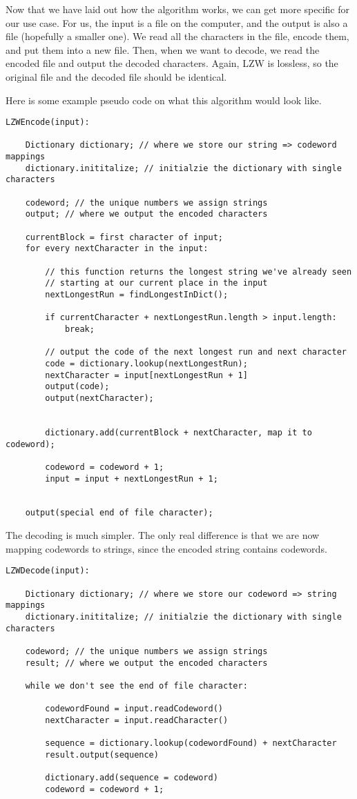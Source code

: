 \documentclass[12pt,twoside]{reedthesis}
\begin{document}
Now that we have laid out how the algorithm works, we can get more specific for our use case. For us, the input is a file on the computer, and the output is also a file (hopefully a smaller one). We read all the characters in the file, encode them, and put them into a new file. Then, when we want to decode, we read the encoded file and output the decoded characters. Again, LZW is lossless, so the original file and the decoded file should be identical.

Here is some example pseudo code on what this algorithm would look like.
\begin{verbatim}
LZWEncode(input):

    Dictionary dictionary; // where we store our string => codeword mappings
    dictionary.inititalize; // initialzie the dictionary with single characters

    codeword; // the unique numbers we assign strings
    output; // where we output the encoded characters

    currentBlock = first character of input;
    for every nextCharacter in the input:
        
        // this function returns the longest string we've already seen
        // starting at our current place in the input
        nextLongestRun = findLongestInDict();

        if currentCharacter + nextLongestRun.length > input.length:
            break;
            
        // output the code of the next longest run and next character
        code = dictionary.lookup(nextLongestRun);
        nextCharacter = input[nextLongestRun + 1]
        output(code);
        output(nextCharacter);

        
        dictionary.add(currentBlock + nextCharacter, map it to codeword);

        codeword = codeword + 1;
        input = input + nextLongestRun + 1;


    output(special end of file character);
\end{verbatim}
The decoding is much simpler. The only real difference is that we are now mapping codewords to strings, since the encoded string contains codewords.
\begin{verbatim}
LZWDecode(input):

    Dictionary dictionary; // where we store our codeword => string mappings
    dictionary.inititalize; // initialzie the dictionary with single characters

    codeword; // the unique numbers we assign strings
    result; // where we output the encoded characters

    while we don't see the end of file character:

        codewordFound = input.readCodeword()
        nextCharacter = input.readCharacter()

        sequence = dictionary.lookup(codewordFound) + nextCharacter
        result.output(sequence)

        dictionary.add(sequence = codeword)
        codeword = codeword + 1;
\end{verbatim}
\end{document}

